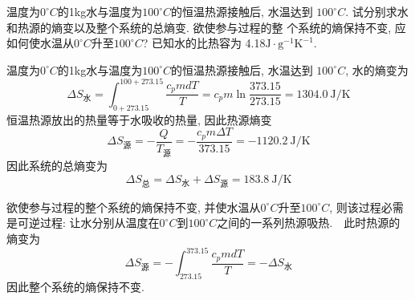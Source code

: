 \begin{problem}[1.17]
温度为$0^\circ C$的1kg水与温度为$100^\circ C$的恒温热源接触后, 水温达到
$100^\circ C$. 试分别求水和热源的熵变以及整个系统的总熵变. 欲使参与过程的整
个系统的熵保持不变, 应如何使水温从$0^\circ C$升至$100^\circ C$? 已知水的比热容为
4.18$\mathrm{J\cdot g^{-1} K^{-1}}$.
\end{problem}
\begin{solution}
温度为$0^\circ C$的1kg水与温度为$100^\circ C$的恒温热源接触后, 水温达到
$100^\circ C$, 水的熵变为
\[
\Delta S_{\text{水}} = \int_{0+273.15}^{100+273.15} \frac{c_p m d T}{T} = c_p m \ln\frac{373.15}{273.15} = 1304.0 \mathrm{~J/K}
\]
恒温热源放出的热量等于水吸收的热量, 因此热源熵变
\[
\Delta S_{\text{源}} = -\frac{Q}{T_{\text{源}}} = -\frac{c_p m \Delta T}{373.15} = -1120.2 \mathrm{~J/K}
\]
因此系统的总熵变为
\[
\Delta S_{\text{总}} = \Delta S_{\text{水}} + \Delta S_{\text{源}} = 183.8 \mathrm{~J/K}
\]

欲使参与过程的整个系统的熵保持不变, 并使水温从$0^\circ C$升至$100^\circ C$, 则该过程必需是可逆过程: 让水分别从温度在$0^\circ C$到$100^\circ C$之间的一系列热源吸热.　此时热源的熵变为
\[
\Delta S_{\text{源}}=-\int_{273.15}^{373.15} \frac{c_p m d T}{T}  = -\Delta S_{\text{水}}
\]
因此整个系统的熵保持不变.
\end{solution}
